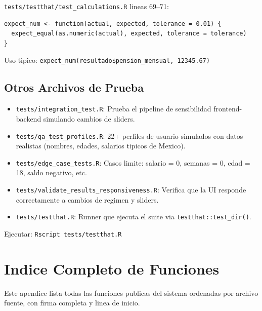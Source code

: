 \documentclass[11pt, letterpaper, twoside]{report}
\begin{document}
\begin{codigobox}
\texttt{tests/testthat/test\_calculations.R} lineas 69--71:
\begin{lstlisting}[caption={Helper expect\_num}]
expect_num <- function(actual, expected, tolerance = 0.01) {
  expect_equal(as.numeric(actual), expected, tolerance = tolerance)
}
\end{lstlisting}
Uso tipico: \texttt{expect\_num(resultado\$pension\_mensual, 12345.67)}
\end{codigobox}


\section{Otros Archivos de Prueba}

\begin{codigobox}
\begin{itemize}[nosep]
\item \texttt{tests/integration\_test.R}: Prueba el pipeline de sensibilidad
      frontend-backend simulando cambios de sliders.
\item \texttt{tests/qa\_test\_profiles.R}: 22+ perfiles de usuario simulados
      con datos realistas (nombres, edades, salarios tipicos de Mexico).
\item \texttt{tests/edge\_case\_tests.R}: Casos limite: salario = 0, semanas = 0,
      edad = 18, saldo negativo, etc.
\item \texttt{tests/validate\_results\_responsiveness.R}: Verifica que la UI
      responde correctamente a cambios de regimen y sliders.
\item \texttt{tests/testthat.R}: Runner que ejecuta el suite via
      \texttt{testthat::test\_dir()}.
\end{itemize}
Ejecutar: \texttt{Rscript tests/testthat.R}
\end{codigobox}


\appendix

\chapter{Indice Completo de Funciones}
\label{app:indice}

Este apendice lista todas las funciones publicas del sistema ordenadas por archivo
fuente, con firma completa y linea de inicio.
\end{document}
